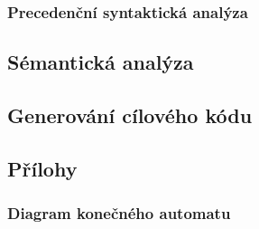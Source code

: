 \documentclass[a4paper,12pt]{article}
\begin{document}
\subsubsection{Precedenční syntaktická analýza}

\clearpage

\subsection{Sémantická analýza}

\subsection{Generování cílového kódu}

\clearpage

\subsection{Přílohy}

\subsubsection{Diagram konečného automatu}
    
\clearpage
\end{document}
